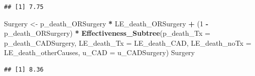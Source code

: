 \documentclass[
]{article}
\newenvironment{Shaded}{\begin{snugshade}}{\end{snugshade}}
\newcommand{\AttributeTok}[1]{\textcolor[rgb]{0.13,0.29,0.53}{#1}}
\newcommand{\DecValTok}[1]{\textcolor[rgb]{0.00,0.00,0.81}{#1}}
\newcommand{\FunctionTok}[1]{\textcolor[rgb]{0.13,0.29,0.53}{\textbf{#1}}}
\newcommand{\NormalTok}[1]{#1}
\newcommand{\OtherTok}[1]{\textcolor[rgb]{0.56,0.35,0.01}{#1}}
\newcommand{\SpecialCharTok}[1]{\textcolor[rgb]{0.81,0.36,0.00}{\textbf{#1}}}
\begin{document}
\begin{verbatim}
## [1] 7.75
\end{verbatim}

\begin{Shaded}
\begin{Highlighting}[]
\NormalTok{Surgery  }\OtherTok{\textless{}{-}}\NormalTok{      p\_death\_ORSurgery  }\SpecialCharTok{*}\NormalTok{ LE\_death\_ORSurgery }\SpecialCharTok{+}  
\NormalTok{            (}\DecValTok{1} \SpecialCharTok{{-}}\NormalTok{ p\_death\_ORSurgery) }\SpecialCharTok{*} \FunctionTok{Effectiveness\_Subtree}\NormalTok{(}\AttributeTok{p\_death\_Tx    =}\NormalTok{ p\_death\_CADSurgery, }
                                                            \AttributeTok{LE\_death\_Tx   =}\NormalTok{ LE\_death\_CAD, }
                                                            \AttributeTok{LE\_death\_noTx =}\NormalTok{ LE\_death\_otherCauses, }
                                                            \AttributeTok{u\_CAD         =}\NormalTok{ u\_CADSurgery)}
\NormalTok{Surgery}
\end{Highlighting}
\end{Shaded}

\begin{verbatim}
## [1] 8.36
\end{verbatim}
\end{document}

